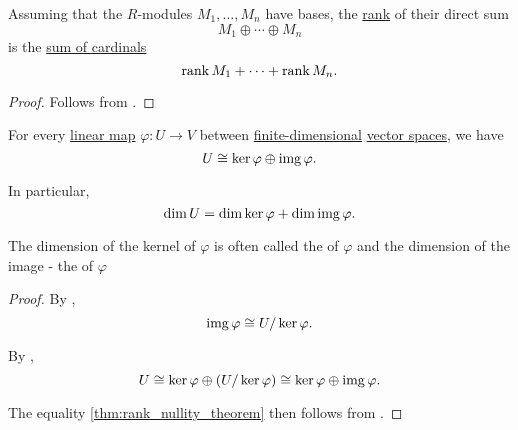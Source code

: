 \begin{proposition}\label{thm:rank_of_direct_sum}
  Assuming that the \( R \)-modules \( M_1, \ldots, M_n \) have bases, the \hyperref[thm:commutative_module_rank]{rank} of their direct sum
  \begin{equation*}
    M_1 \oplus \cdots \oplus M_n
  \end{equation*}
  is the \hyperref[def:cardinal_arithmetic/addition]{sum of cardinals}
  \begin{equation*}
    \operatorname{rank} M_1 + \cdots + \operatorname{rank} M_n.
  \end{equation*}
\end{proposition}
\begin{proof}
  Follows from .
\end{proof}

\begin{theorem}\label{thm:rank_nullity_theorem}
  For every \hyperref[def:semimodule/homomorphism]{linear map} \( \varphi: U \to V \) between \hyperref[thm:vector_space_dimension]{finite-dimensional} \hyperref[def:vector_space]{vector spaces}, we have
  \begin{equation}\label{eq:thm:rank_nullity_theorem}
    U \cong \ker \varphi \oplus \operatorname{img} \varphi.
  \end{equation}

  In particular,
  \begin{equation}\label{eq:thm:rank_nullity_theorem/dim}
    \dim U = \dim \ker \varphi + \dim \operatorname{img} \varphi.
  \end{equation}

  The dimension of the kernel of \( \varphi \) is often called the  of \( \varphi \) and the dimension of the image - the  of \( \varphi \)
\end{theorem}
\begin{proof}
  By ,
  \begin{equation*}
    \operatorname{img} \varphi \cong U / \ker \varphi.
  \end{equation*}

  By ,
  \begin{equation*}
    U \cong \ker \varphi \oplus (U / \ker \varphi) \cong \ker \varphi \oplus \operatorname{img} \varphi.
  \end{equation*}

  The equality \eqref{thm:rank_nullity_theorem} then follows from .
\end{proof}
